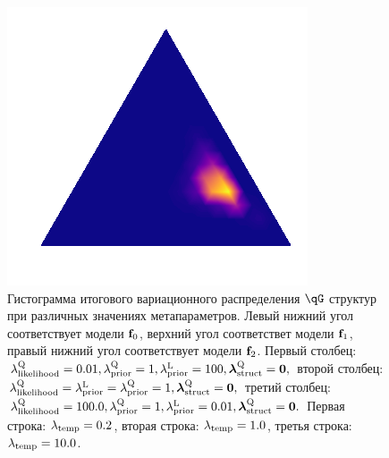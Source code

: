 \begin{figure}
\begin{minipage}{.3\textwidth}
\subcaption{}
\end{minipage}
 \begin{minipage}{.3\textwidth}
    \includegraphics[width=\textwidth]{plots/experiment_structures/triangle_10overfit.png}
\subcaption{}
\end{minipage}
\caption{Гистограмма итогового вариационного распределения $\qG$ структур при различных значениях метапараметров. Левый нижний угол соответствует модели $\mathbf{f}_0$, верхний угол соответствет модели $\mathbf{f}_1$, правый нижний угол соответствует модели $\mathbf{f}_2$.
Первый столбец:  $\lambda_\text{likelihood}^\text{Q} = 0.01, \lambda_\text{prior}^\text{Q} = 1, \lambda_\text{prior}^\text{L} = 100, \boldsymbol{\lambda}_\text{struct}^\text{Q} = \mathbf{0},$  второй столбец: $\lambda_\text{likelihood}^\text{Q} = \lambda_\text{prior}^\text{L} = \lambda_\text{prior}^\text{Q} = 1, \boldsymbol{\lambda}_\text{struct}^\text{Q} = \mathbf{0},$ 
третий столбец: $\lambda_\text{likelihood}^\text{Q} = 100.0, \lambda_\text{prior}^\text{Q} = 1, \lambda_\text{prior}^\text{L} = 0.01, \boldsymbol{\lambda}_\text{struct}^\text{Q} = \mathbf{0}.$ 
Первая строка: $\lambda_{\text{temp}} = 0.2$, вторая строка: $\lambda_{\text{temp}} = 1.0$, третья строка: $\lambda_{\text{temp}} = 10.0$.}
\label{fig:fig_triangle_hist}
\end{figure}


